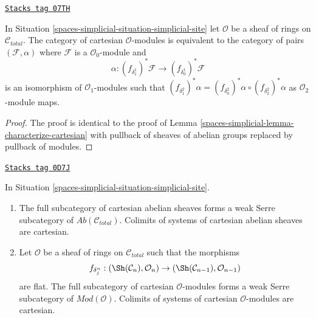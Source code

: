 \begin{lemma}
\label{spaces-simplicial-lemma-characterize-cartesian-modules}
\href{https://stacks.math.columbia.edu/tag/07TH}{\texttt{Stacks tag 07TH}}

In Situation \ref{spaces-simplicial-situation-simplicial-site}
let $\mathcal{O}$ be a sheaf of rings on $\mathcal{C}_{total}$.
The category of cartesian $\mathcal{O}$-modules
is equivalent to the category of pairs $(\mathcal{F}, \alpha)$
where $\mathcal{F}$ is a $\mathcal{O}_0$-module
and
$$
\alpha :
(f_{\delta_1^1})^*\mathcal{F}
\longrightarrow (f_{\delta_0^1})^*\mathcal{F}
$$
is an isomorphism of $\mathcal{O}_1$-modules such that
$(f_{\delta^2_1})^*\alpha =
(f_{\delta^2_0})^*\alpha \circ (f_{\delta^2_2})^*\alpha$
as $\mathcal{O}_2$-module maps.
\end{lemma}

\begin{proof}
The proof is identical to the proof of
Lemma \ref{spaces-simplicial-lemma-characterize-cartesian}
with pullback of sheaves of abelian groups replaced
by pullback of modules.
\end{proof}

\begin{lemma}
\label{spaces-simplicial-lemma-Serre-subcat-cartesian-modules}
\href{https://stacks.math.columbia.edu/tag/0D7J}{\texttt{Stacks tag 0D7J}}

In Situation \ref{spaces-simplicial-situation-simplicial-site}.
\begin{enumerate}
\item The full subcategory of cartesian abelian sheaves forms a
weak Serre subcategory of $\textit{Ab}(\mathcal{C}_{total})$.
Colimits of systems of cartesian abelian sheaves are cartesian.
\item Let $\mathcal{O}$ be a sheaf of rings on $\mathcal{C}_{total}$
such that the morphisms
$$
f_{\delta^n_j} : (\Sh(\mathcal{C}_n), \mathcal{O}_n)
\to (\Sh(\mathcal{C}_{n - 1}), \mathcal{O}_{n - 1})
$$
are flat. The full subcategory of cartesian $\mathcal{O}$-modules forms a
weak Serre subcategory of $\textit{Mod}(\mathcal{O})$.
Colimits of systems of cartesian $\mathcal{O}$-modules are cartesian.
\end{enumerate}
\end{lemma}

